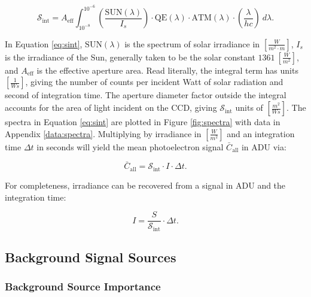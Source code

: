 \begin{equation} \label{eq:sint}
 \mathcal{S}_\mathrm{int} = A_\mathrm{eff}
	\int_{10^{-8}}^{10^{-6}}{ \left( \frac{\textrm{SUN}(\lambda)}{I_s} \right) \cdot \textrm{QE}(\lambda) \cdot \textrm{ATM}(\lambda)
  \cdot \left( \frac{\lambda}{h c} \right) \: d\lambda}.
\end{equation}

In Equation \ref{eq:sint}, $\textrm{SUN}(\lambda)$ is the spectrum of solar irradiance in 
$\left[\frac{W}{m^2\cdot m} \right]$, $I_s$ is the irradiance of the Sun, generally taken to be
the solar constant $1361 \: \left[ \frac{W}{m^2} \right]$, and $A_\mathrm{eff}$ is the effective aperture area. Read literally, the integral term has
units $\left[ \frac{1}{Ws} \right]$, giving the number of counts per incident Watt of solar
radiation and second of integration time. The aperture diameter factor outside the integral accounts
for the area of light incident on the CCD, giving $\mathcal{S}_\mathrm{int}$ units of $\left[ \frac{m^2}{Ws}
\right]$. The spectra in Equation \ref{eq:sint} are plotted in Figure \ref{fig:spectra} with data in Appendix \ref{data:spectra}. Multiplying by irradiance in $\left[ \frac{W}{m^2} \right]$ and an integration time $\Delta t$ 
in seconds will yield the mean photoelectron signal $\bar{C}_\mathrm{all}$ in ADU via:

\begin{equation} \label{eq:irrad_to_count}
  \bar{C}_\mathrm{all} = \mathcal{S}_\mathrm{int} \cdot I \cdot \Delta t.
\end{equation}

For completeness, irradiance can be recovered from a signal in ADU and the integration time:

\begin{equation} \label{eq:count_to_irrad}
  I = \frac{S}{\mathcal{S}_\mathrm{int}} \cdot \Delta t.
\end{equation}

\subsection{Background Signal Sources}

\subsubsection{Background Source Importance}

